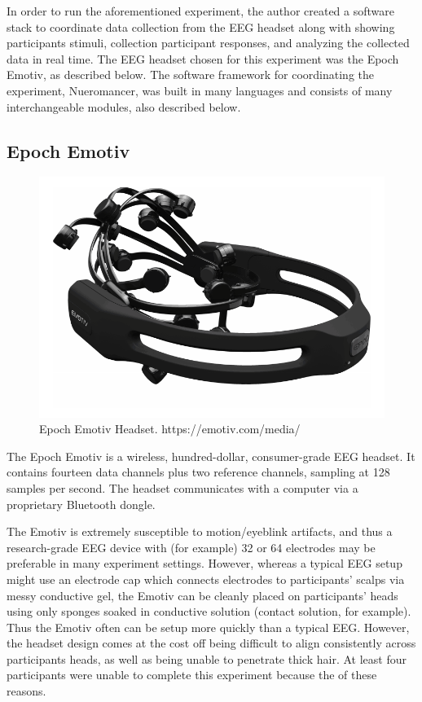 \documentclass[11pt]{report}
\begin{document}
In order to run the aforementioned experiment, the author created a software stack to coordinate data collection from the EEG headset along with showing participants stimuli, collection participant responses, and analyzing the collected data in real time.  The EEG headset chosen for this experiment was the Epoch Emotiv, as described below.  The software framework for coordinating the experiment, Nueromancer, was built in many languages and consists of many interchangeable modules, also described below.

\subsection{Epoch Emotiv}
	\begin{figure}[t]
	
	\includegraphics[width=12cm]{emotiv}	
	\centering
	\caption{Epoch Emotiv Headset. https://emotiv.com/media/}
	\end{figure}
	
	The Epoch Emotiv\cite{emotiv} is a wireless, hundred-dollar, consumer-grade EEG headset.  It contains fourteen data channels plus two reference channels, sampling at 128 samples per second.  The headset communicates with a computer via a proprietary Bluetooth dongle.
	
	The Emotiv is extremely susceptible to motion/eyeblink artifacts, and thus a research-grade EEG device with (for example) 32 or 64 electrodes may be preferable in many experiment settings.  However, whereas a typical EEG setup might use an electrode cap which connects electrodes to participants' scalps via messy conductive gel, the Emotiv can be cleanly placed on participants' heads using only sponges soaked in conductive solution (contact solution, for example).  Thus the Emotiv often can be setup more quickly than a typical EEG.  However, the headset design comes at the cost off being difficult to align consistently across participants heads, as well as being unable to penetrate thick hair.  At least four participants were unable to complete this experiment because the of these reasons.
	
\end{document}
